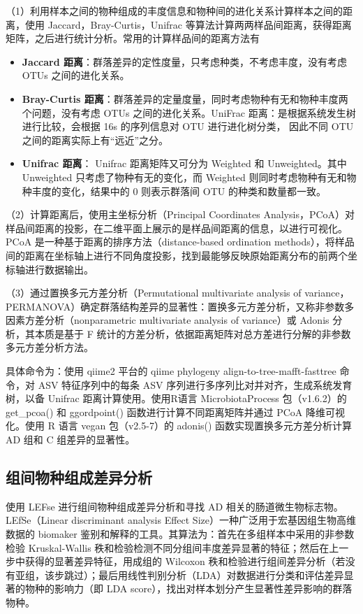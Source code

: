 \documentclass[supercite]{HustGraduPaper}
\begin{document}
（1）利用样本之间的物种组成的丰度信息和物种间的进化关系计算样本之间的距离，使用 Jaccard\cite{jaccard}，Bray-Curtis\cite{bray}，Unifrac\cite{unifrac} 等算法计算两两样品间距离，获得距离矩阵，之后进行统计分析。常用的计算样品间的距离方法有
\begin{itemize}
	\item {\songti \bfseries Jaccard 距离}：群落差异的定性度量，只考虑种类，不考虑丰度，没有考虑 OTUs 之间的进化关系。
	\item {\songti \bfseries Bray-Curtis 距离}：群落差异的定量度量，同时考虑物种有无和物种丰度两个问题，没有考虑 OTUs 之间的进化关系。UniFrac 距离：是根据系统发生树进行比较，会根据 16s 的序列信息对 OTU 进行进化树分类， 因此不同 OTU 之间的距离实际上有“远近”之分。
	\item {\songti \bfseries Unifrac 距离}： Unifrac 距离矩阵又可分为 Weighted 和 Unweighted。其中 Unweighted 只考虑了物种有无的变化，而 Weighted 则同时考虑物种有无和物种丰度的变化，结果中的 0 则表示群落间 OTU 的种类和数量都一致。
\end{itemize}

（2）计算距离后，使用主坐标分析（Principal Coordinates Analysis，PCoA）\cite{pcoa}对样品间距离的投影，在二维平面上展示的是样品间距离的信息，以进行可视化。PCoA 是一种基于距离的排序方法（distance-based ordination methods），将样品间的距离在坐标轴上进行不同角度投影，找到最能够反映原始距离分布的前两个坐标轴进行数据输出。

（3）通过置换多元方差分析（Permutational multivariate analysis of variance，PERMANOVA）\cite{anderson2001new}确定群落结构差异的显著性：置换多元方差分析，又称非参数多因素方差分析（nonparametric multivariate analysis of variance）或 Adonis 分析，其本质是基于 F 统计的方差分析，依据距离矩阵对总方差进行分解的非参数多元方差分析方法。

具体命令为：使用 qiime2 平台的 qiime phylogeny align-to-tree-mafft-fasttree 命令，对 ASV 特征序列中的每条 ASV 序列进行多序列比对并对齐，生成系统发育树，以备 Unifrac 距离计算使用。使用R语言 MicrobiotaProcess 包（v1.6.2）的 get\_pcoa() 和 ggordpoint() 函数进行计算不同距离矩阵并通过 PCoA 降维可视化。使用 R 语言 vegan 包\cite{oksanen2007vegan}（v2.5-7）的 adonis() 函数实现置换多元方差分析计算 AD 组和 C 组差异的显著性。

\subsection{组间物种组成差异分析}
使用 LEFse 进行组间物种组成差异分析和寻找 AD 相关的肠道微生物标志物。LEfSe（Linear discriminant analysis Effect Size）一种广泛用于宏基因组生物高维数据的 biomaker 鉴别和解释的工具\cite{lefse}。其算法为：首先在多组样本中采用的非参数检验 Kruskal-Wallis 秩和检验检测不同分组间丰度差异显著的特征；然后在上一步中获得的显著差异特征，用成组的 Wilcoxon 秩和检验进行组间差异分析（若没有亚组，该步跳过）；最后用线性判别分析（LDA）对数据进行分类和评估差异显著的物种的影响力（即 LDA score），找出对样本划分产生显著性差异影响的群落物种。
\end{document}
